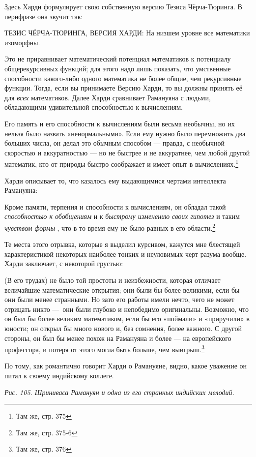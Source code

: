 \documentclass[../main.tex]{subfiles}
\begin{document}
Здесь Харди формулирует свою собственную версию Тезиса Чёрча-Тюринга. В перифразе она звучит так:

ТЕЗИС ЧЁРЧА-ТЮРИНГА, ВЕРСИЯ ХАРДИ: На низшем уровне все математики изоморфны.

Это не приравнивает математический потенциал математиков к потенциалу общерекурсивных функций; для этого надо лишь показать, что умственные способности какого-либо одного математика не более общие, чем рекурсивные функции. Тогда, если вы принимаете Версию Харди, то вы должны принять её для \emph{всех} математиков. Далее Харди сравнивает Рамануяна с людьми, обладающими удивительной способностью к вычислениям.

Его память и его способности к вычислениям были весьма необычны, но их нельзя было назвать «ненормальными». Если ему нужно было перемножить два больших числа, он делал это обычным способом --- правда, с необычной скоростью и аккуратностью --- но не быстрее и не аккуратнее, чем любой другой математик, кто от природы быстро соображает и имеет опыт в вычислениях.\footnote{Там же, стр. 375}

Харди описывает то, что казалось ему выдающимися чертами интеллекта Рамануяна:

Кроме памяти, терпения и способности к вычислениям, он обладал такой \emph{способностью к обобщениям} и к \emph{быстрому изменению своих гипотез} и таким \emph{чувством формы} , что в то время ему не было равных в его области.\footnote{Там же, стр. 375-6}

Те места этого отрывка, которые я выделил курсивом, кажутся мне блестящей характеристикой некоторых наиболее тонких и неуловимых черт разума вообще. Харди заключает, с некоторой грустью:

(В его трудах) не было той простоты и неизбежности, которая отличает величайшие математические открытия; они были бы более великими, если бы они были менее странными. Но зато его работы имели нечто, чего не может отрицать никто ---~они были глубоко и непобедимо оригинальны. Возможно, что он был бы более великим математиком, если бы его «поймали» и «приручили» в юности; он открыл бы много нового и, без сомнения, более важного. С другой стороны, он был бы менее похож на Рамануяна и более --- на европейского профессора, и потеря от этого могла быть больше, чем выигрыш.\footnote{Там же, стр. 376}

По тому, как романтично говорит Харди о Рамануяне, видно, какое уважение он питал к своему индийскому коллеге.

\emph{Рис. 105. Шриниваса Рамануян и одна из его странных индийских мелодий.}
\end{document}
